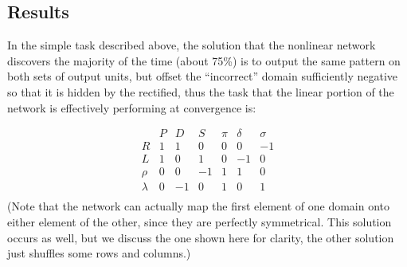 \documentclass[10pt,letterpaper]{article}
\begin{document}
\subsection{Results}
In the simple task described above, the solution that the nonlinear network discovers the majority of the time (about 75\%) is to output the same pattern on both sets of output units, but offset the ``incorrect'' domain sufficiently negative so that it is hidden by the rectified, thus the task that the linear portion of the network is effectively performing at convergence is: \par
\vspace{-1em}
{ 
\[
\begin{array}{c|cccccc} 
& P & D & S & \pi & \delta & \sigma \\
\hline
R & 1 & 1 & 0 & 0 & 0 & -1 \\
L & 1 & 0 & 1 & 0 & -1 & 0 \\
\rho & 0 & 0 & -1 & 1 & 1 & 0\\
\lambda & 0 & -1 & 0 & 1 & 0 & 1\\
\end{array} 
\]
}
(Note that the network can actually map the first element of one domain onto either element of the other, since they are perfectly symmetrical. This solution occurs as well, but we discuss the one shown here for clarity, the other solution just shuffles some rows and columns.) \par 
\end{document}
